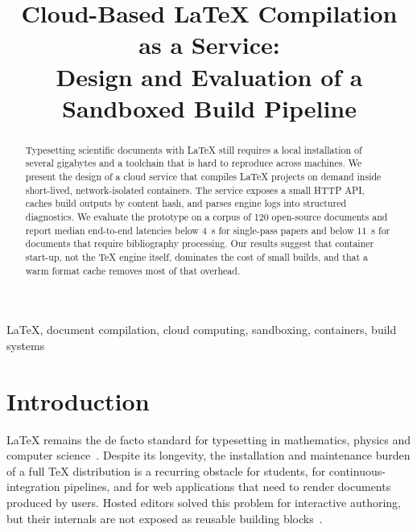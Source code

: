 \documentclass[conference]{IEEEtran}
\begin{document}
\title{Cloud-Based \LaTeX{} Compilation as a Service:\\
Design and Evaluation of a Sandboxed Build Pipeline}

\author{%
  \and
  \and
}

\maketitle

\begin{abstract}
Typesetting scientific documents with \LaTeX{} still requires a local
installation of several gigabytes and a toolchain that is hard to reproduce
across machines. We present the design of a cloud service that compiles
\LaTeX{} projects on demand inside short-lived, network-isolated containers.
The service exposes a small HTTP API, caches build outputs by content hash,
and parses engine logs into structured diagnostics. We evaluate the prototype
on a corpus of 120 open-source documents and report median end-to-end
latencies below 4~s for single-pass papers and below 11~s for documents that
require bibliography processing. Our results suggest that container start-up,
not the \TeX{} engine itself, dominates the cost of small builds, and that a
warm format cache removes most of that overhead.
\end{abstract}

\begin{IEEEkeywords}
LaTeX, document compilation, cloud computing, sandboxing, containers, build systems
\end{IEEEkeywords}

\section{Introduction}
\LaTeX{} remains the de facto standard for typesetting in mathematics,
physics and computer science~\cite{lamport1994latex}. Despite its longevity,
the installation and maintenance burden of a full \TeX{} distribution is a
recurring obstacle for students, for continuous-integration pipelines, and for
web applications that need to render documents produced by users. Hosted
editors solved this problem for interactive authoring, but their internals
are not exposed as reusable building blocks~\cite{overleaf2023}.
\end{document}
